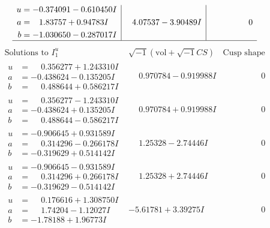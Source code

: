 \documentclass[1p]{elsarticle_modified}
\theoremstyle{definition}
\newcommand{\I}{\sqrt{-1}}
\begin{document}
$$\begin{array}{c|c|c}
\begin{aligned}
u &= -0.374091 - 0.610450 I \\
a &= \phantom{-}1.83757 + 0.94783 I \\
b &= -1.030650 - 0.287017 I\end{aligned}
 & \phantom{-}4.07537 - 3.90489 I & \phantom{-0.000000 } 0\\
 \hline 
 \end{array}$$\newpage$$\begin{array}{c|c|c}  
\text{Solutions to }I^u_{1}& \I (\text{vol} + \sqrt{-1}CS) & \text{Cusp shape}\\
 \hline 
\begin{aligned}
u &= \phantom{-}0.356277 + 1.243310 I \\
a &= -0.438624 - 0.135205 I \\
b &= \phantom{-}0.488644 + 0.586217 I\end{aligned}
 & \phantom{-}0.970784 - 0.919988 I & \phantom{-0.000000 } 0 \\ \hline\begin{aligned}
u &= \phantom{-}0.356277 - 1.243310 I \\
a &= -0.438624 + 0.135205 I \\
b &= \phantom{-}0.488644 - 0.586217 I\end{aligned}
 & \phantom{-}0.970784 + 0.919988 I & \phantom{-0.000000 } 0 \\ \hline\begin{aligned}
u &= -0.906645 + 0.931589 I \\
a &= \phantom{-}0.314296 - 0.266178 I \\
b &= -0.319629 + 0.514142 I\end{aligned}
 & \phantom{-}1.25328 - 2.74446 I & \phantom{-0.000000 } 0 \\ \hline\begin{aligned}
u &= -0.906645 - 0.931589 I \\
a &= \phantom{-}0.314296 + 0.266178 I \\
b &= -0.319629 - 0.514142 I\end{aligned}
 & \phantom{-}1.25328 + 2.74446 I & \phantom{-0.000000 } 0 \\ \hline\begin{aligned}
u &= \phantom{-}0.176616 + 1.308750 I \\
a &= \phantom{-}1.74204 - 1.12027 I \\
b &= -1.78188 + 1.96773 I\end{aligned}
 & -5.61781 + 3.39275 I & \phantom{-0.000000 } 0 \\ \hline\begin{aligned}

\end{aligned}
\end{array}$$
\end{document}
